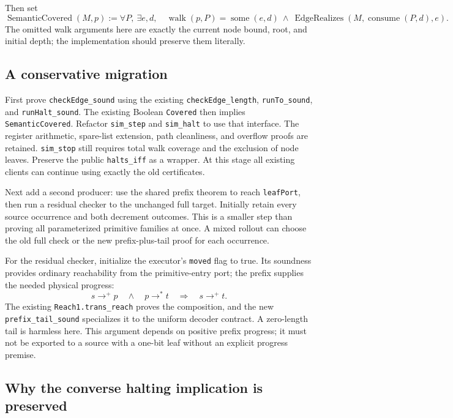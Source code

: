 \documentclass[11pt,letterpaper]{article}
\newcommand{\code}[1]{\texttt{\small #1}}
\newcommand{\Reach}{\mathrel{\longrightarrow^{*}}}
\newcommand{\Reachp}{\mathrel{\longrightarrow^{+}}}
\begin{document}
Then set
\[
\operatorname{SemanticCovered}(M,p):=
 \forall P,\ \exists e,d,\quad
 \operatorname{walk}(p,P)=\operatorname{some}(e,d)
 \ \land\ \operatorname{EdgeRealizes}(M,\operatorname{consume}(P,d),e).
\]
The omitted walk arguments here are exactly the current node bound, root, and initial
depth; the implementation should preserve them literally.

\subsection{A conservative migration}

First prove \code{checkEdge\_sound} using the existing \code{checkEdge\_length},
\code{runTo\_sound}, and \code{runHalt\_sound}. The existing Boolean \code{Covered}
then implies \code{SemanticCovered}. Refactor \code{sim\_step} and \code{sim\_halt}
to use that interface. The register arithmetic, spare-list extension, path cleanliness,
and overflow proofs are retained. \code{sim\_stop} still requires total walk coverage
and the exclusion of node leaves. Preserve the public \code{halts\_iff} as a wrapper.
At this stage all existing clients can continue using exactly the old certificates.

Next add a second producer: use the shared prefix theorem to reach \code{leafPort},
then run a residual checker to the unchanged full target. Initially retain every
source occurrence and both decrement outcomes. This is a smaller step than proving
all parameterized primitive families at once. A mixed rollout can choose the old
full check or the new prefix-plus-tail proof for each occurrence.

For the residual checker, initialize the executor's \code{moved} flag to true.
Its soundness provides ordinary reachability from the primitive-entry port; the
prefix supplies the needed physical progress:
\[
  s\Reachp p\quad\land\quad p\Reach t
       \quad\Longrightarrow\quad s\Reachp t.
\]
The existing \code{Reach1.trans\_reach} proves the composition, and the new
\code{prefix\_tail\_sound} specializes it to the uniform decoder contract. A zero-length
tail is harmless here. This argument depends on positive prefix progress; it must not
be exported to a source with a one-bit leaf without an explicit progress premise.

\subsection{Why the converse halting implication is preserved}
\end{document}
